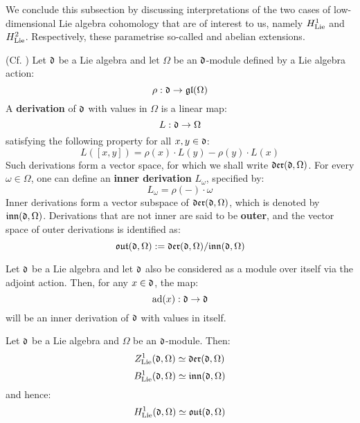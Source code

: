         We conclude this subsection by discussing interpretations of the two cases of low-dimensional Lie algebra cohomology that are of interest to us, namely $H^1_{\mathrm{Lie}}$ and $H^2_{\mathrm{Lie}}$. Respectively, these parametrise so-called  and abelian extensions.
        \begin{definition} \label{def: lie_derivations}
            (Cf. \cite[Section VII.2, Equation 2.2, p. 234]{hilton_stammbach_homological_algebra}) Let $\mathfrak{d}$ be a Lie algebra and let $\Omega$ be an $\mathfrak{d}$-module defined by a Lie algebra action:
                $$\rho: \mathfrak{d} \to \mathfrak{gl}(\Omega)$$
            A \textbf{derivation} of $\mathfrak{d}$ with values in $\Omega$ is a linear map:
                $$L: \mathfrak{d} \to \Omega$$
            satisfying the following property for all $x, y \in \mathfrak{d}$:
                $$L( [x, y] ) = \rho(x) \cdot L(y) - \rho(y) \cdot L(x)$$
            Such derivations form a vector space, for which we shall write $\mathfrak{der}(\mathfrak{d}, \Omega)$. For every $\omega \in \Omega$, one can define an \textbf{inner derivation} $L_{\omega}$, specified by:
                $$L_{\omega} = \rho(-) \cdot \omega$$
            Inner derivations form a vector subspace of $\mathfrak{der}(\mathfrak{d}, \Omega)$, which is denoted by $\mathfrak{inn}(\mathfrak{d}, \Omega)$. Derivations that are not inner are said to be \textbf{outer}, and the vector space of outer derivations is identified as:
                $$\mathfrak{out}(\mathfrak{d}, \Omega) := \mathfrak{der}(\mathfrak{d}, \Omega)/\mathfrak{inn}(\mathfrak{d}, \Omega)$$
        \end{definition}
        \begin{example}
            Let $\mathfrak{d}$ be a Lie algebra and let $\mathfrak{d}$ also be considered as a module over itself via the adjoint action. Then, for any $x \in \mathfrak{d}$, the map:
                $$\mathrm{ad}(x): \mathfrak{d} \to \mathfrak{d}$$
            will be an inner derivation of $\mathfrak{d}$ with values in itself.
        \end{example}
        \begin{theorem}
            \cite[Theorem 2.1 and Proposition 2.2]{hilton_stammbach_homological_algebra} Let $\mathfrak{d}$ be a Lie algebra and $\Omega$ be an $\mathfrak{d}$-module. Then:
                $$Z^1_{\mathrm{Lie}}(\mathfrak{d}, \Omega) \simeq \mathfrak{der}(\mathfrak{d}, \Omega)$$
                $$B^1_{\mathrm{Lie}}(\mathfrak{d}, \Omega) \simeq \mathfrak{inn}(\mathfrak{d}, \Omega)$$
            and hence:
                $$H^1_{\mathrm{Lie}}(\mathfrak{d}, \Omega) \simeq \mathfrak{out}(\mathfrak{d}, \Omega)$$
        \end{theorem}
